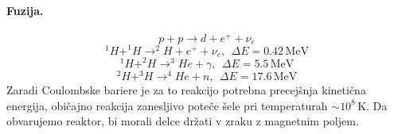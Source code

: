\documentclass[a4paper]{article}
\begin{document}
\paragraph{Fuzija.} $$p + p \to d + e^+ + \nu_e$$
$$^1H + ^1H \to ^2H + e^+ + \nu_e,~~\Delta E = 0.42\,\mathrm{MeV}$$
$$^1H + ^2H \to ^3He + \gamma, ~~\Delta E = 5.5\,\mathrm{MeV}$$
$$^2H + ^3H \to ^4He + n, ~~\Delta E = 17.6\,\mathrm{MeV}$$
Zaradi Coulombske bariere je za to reakcijo potrebna precejšnja kinetična energija, običajno reakcija zanesljivo poteče šele pri temperaturah $\sim 10^8\,\mathrm{K}$.
Da obvarujemo reaktor, bi morali delce držati v zraku z magnetnim poljem.
\end{document}
